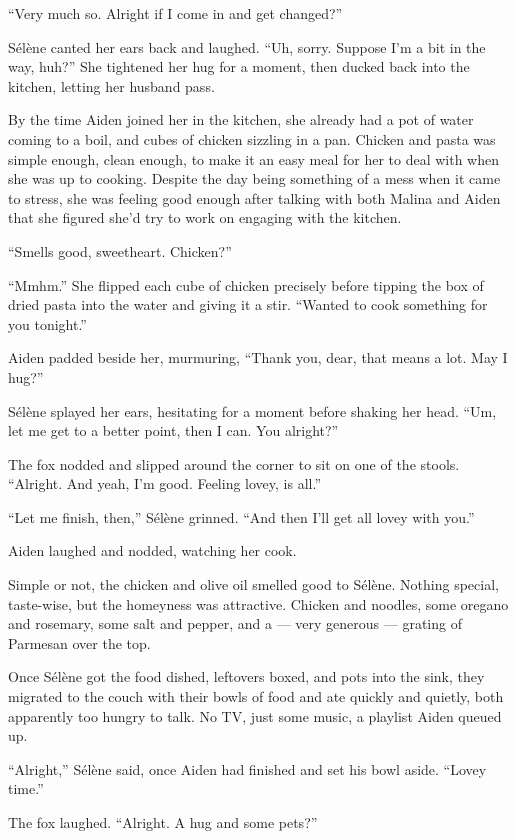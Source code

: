``Very much so. Alright if I come in and get changed?''

Sélène canted her ears back and laughed. ``Uh, sorry. Suppose I'm a bit in the way, huh?'' She tightened her hug for a moment, then ducked back into the kitchen, letting her husband pass.

By the time Aiden joined her in the kitchen, she already had a pot of water coming to a boil, and cubes of chicken sizzling in a pan. Chicken and pasta was simple enough, clean enough, to make it an easy meal for her to deal with when she was up to cooking. Despite the day being something of a mess when it came to stress, she was feeling good enough after talking with both Malina and Aiden that she figured she'd try to work on engaging with the kitchen.

``Smells good, sweetheart. Chicken?''

``Mmhm.'' She flipped each cube of chicken precisely before tipping the box of dried pasta into the water and giving it a stir. ``Wanted to cook something for you tonight.''

Aiden padded beside her, murmuring, ``Thank you, dear, that means a lot. May I hug?''

Sélène splayed her ears, hesitating for a moment before shaking her head. ``Um, let me get to a better point, then I can. You alright?''

The fox nodded and slipped around the corner to sit on one of the stools. ``Alright. And yeah, I'm good. Feeling lovey, is all.''

``Let me finish, then,'' Sélène grinned. ``And then I'll get all lovey with you.''

Aiden laughed and nodded, watching her cook.

Simple or not, the chicken and olive oil smelled good to Sélène. Nothing special, taste-wise, but the homeyness was attractive. Chicken and noodles, some oregano and rosemary, some salt and pepper, and a --- very generous --- grating of Parmesan over the top.

Once Sélène got the food dished, leftovers boxed, and pots into the sink, they migrated to the couch with their bowls of food and ate quickly and quietly, both apparently too hungry to talk. No TV, just some music, a playlist Aiden queued up.

``Alright,'' Sélène said, once Aiden had finished and set his bowl aside. ``Lovey time.''

The fox laughed. ``Alright. A hug and some pets?''

